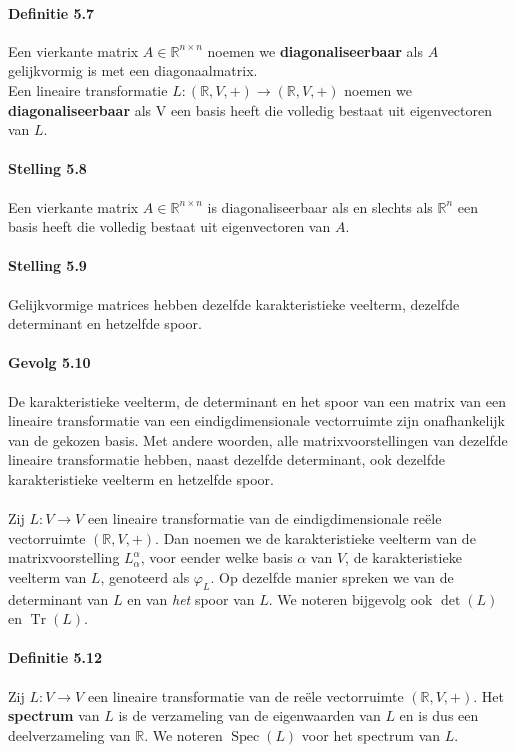 \documentclass[11pt,oneside,a4paper]{article}
\DeclareMathOperator{\Tr}{Tr}
\DeclareMathOperator{\Spec}{Spec}
\begin{document}
	\paragraph{Definitie 5.7}
		Een vierkante matrix $A \in \mathbb{R}^{n \times n}$ noemen we \textbf{diagonaliseerbaar} als $A$ gelijkvormig is met een diagonaalmatrix. \\ Een lineaire transformatie $L: (\mathbb{R}, V, +)\to (\mathbb{R}, V, +)$ noemen we \textbf{diagonaliseerbaar} als V een basis heeft die volledig bestaat uit eigenvectoren van $L$.
	\paragraph{Stelling 5.8}
		Een vierkante matrix $A \in \mathbb{R}^{n \times n}$ is diagonaliseerbaar als en slechts als $\mathbb{R}^n$ een basis heeft die volledig bestaat uit eigenvectoren van $A$.
	\paragraph{Stelling 5.9}
		Gelijkvormige matrices hebben dezelfde karakteristieke veelterm, dezelfde determinant en hetzelfde spoor.
	\paragraph{Gevolg 5.10}	
		De karakteristieke veelterm, de determinant en het spoor van een matrix van een lineaire transformatie van een eindigdimensionale vectorruimte zijn onafhankelijk van de gekozen basis. Met andere woorden, alle matrixvoorstellingen van dezelfde lineaire transformatie hebben, naast dezelfde determinant, ook dezelfde karakteristieke veelterm en hetzelfde spoor. \\\\ Zij $L: V \to V$ een lineaire transformatie van de eindigdimensionale reële vectorruimte $(\mathbb{R}, V, +)$. Dan noemen we de karakteristieke veelterm van de matrixvoorstelling $L_\alpha^\alpha$, voor eender welke basis $\alpha$ van $V$, de karakteristieke veelterm van $L$, genoteerd als $\varphi_L$. Op dezelfde manier spreken we van de determinant van $L$ en van \textit{het} spoor van $L$. We noteren bijgevolg ook $\det(L)$ en $\Tr(L)$.
	\paragraph{Definitie 5.12}	
		Zij $L: V \to V$ een lineaire transformatie van de reële vectorruimte $(\mathbb{R}, V, +)$. Het \textbf{spectrum} van $L$ is de verzameling van de eigenwaarden van $L$ en is dus een deelverzameling van $\mathbb{R}$. We noteren $\Spec(L)$ voor het spectrum van $L$.
\end{document}
